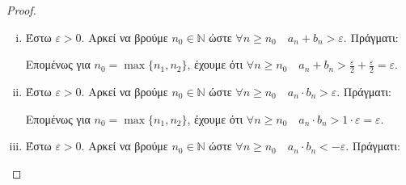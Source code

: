 \documentclass[a4paper,table]{report}
\begin{document}
\begin{proof}
  \begin{enumerate}[i)]
    \item Έστω $ \varepsilon >0 $. Αρκεί να βρούμε $ n_{0} \in \mathbb{N} $ ώστε 
      $ \forall n \geq n_{0} \quad a_{n}+b_{n} > \varepsilon $. Πράγματι:
      Επομένως για $ n_{0}= \max \{ n_{1}, n_{2} \} $, έχουμε ότι $ \forall n \geq n_{0}
      \quad a_{n}+ b_{n} > \frac{\varepsilon}{2} + \frac{\varepsilon}{2} = 
      \varepsilon $. 
    \item Έστω $ \varepsilon >0 $. Αρκεί να βρούμε $ n_{0} \in \mathbb{N} $ ώστε 
      $ \forall n \geq n_{0} \quad a_{n}\cdot b_{n} > \varepsilon $. Πράγματι:
      Επομένως για $ n_{0}= \max \{ n_{1}, n_{2} \} $, έχουμε ότι $ \forall n \geq n_{0}
      \quad a_{n}\cdot b_{n} > 1 \cdot \varepsilon = \varepsilon $. 
    \item Έστω $ \varepsilon >0 $. Αρκεί να βρούμε $ n_{0} \in \mathbb{N} $ ώστε 
      $ \forall n \geq n_{0} \quad a_{n}\cdot b_{n} < - \varepsilon $. Πράγματι:
\end{enumerate}
\end{proof}
\end{document}
